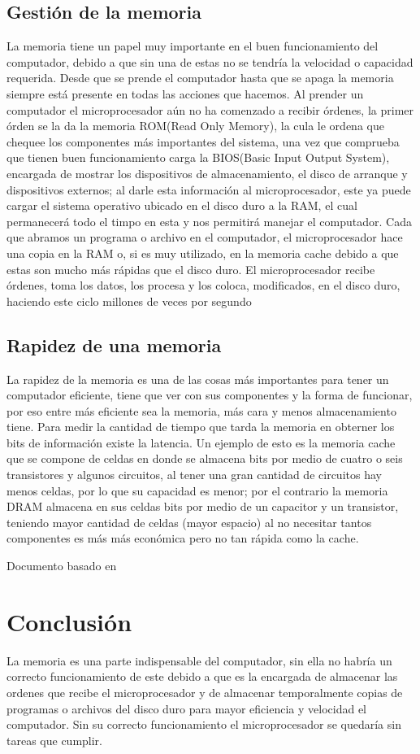 \documentclass{article}
\begin{document}
\subsection{Gestión de la memoria}
La memoria tiene un papel muy importante en el buen funcionamiento del computador, debido a que sin una de estas no se tendría la velocidad o capacidad requerida. Desde que se prende el computador hasta que se apaga la memoria siempre está presente en todas las acciones que hacemos. Al prender un computador el microprocesador aún no ha comenzado a recibir órdenes, la primer órden se la da la memoria ROM(Read Only Memory), la cula le ordena que chequee los componentes más importantes del sistema, una vez que comprueba que tienen buen funcionamiento carga la BIOS(Basic Input Output System), encargada de mostrar los dispositivos de almacenamiento, el disco de arranque y dispositivos externos; al darle esta información al microprocesador, este ya puede cargar el sistema operativo ubicado en el disco duro a la RAM, el cual permanecerá todo el timpo en esta y nos permitirá manejar el computador. Cada que abramos un programa o archivo en el computador, el microprocesador hace una copia en la RAM o, si es muy utilizado, en la memoria cache debido a que estas son mucho más rápidas que el disco duro. El microprocesador recibe órdenes, toma los datos, los procesa y los coloca, modificados, en el disco duro, haciendo este ciclo millones de veces por segundo

\subsection{Rapidez de una memoria}
La rapidez de la memoria es una de las cosas más importantes para tener un computador eficiente, tiene que ver con sus componentes y la forma de funcionar, por eso entre más eficiente sea la memoria, más cara y menos almacenamiento tiene. Para medir la cantidad de tiempo que tarda la memoria en obterner los bits de información existe la latencia. Un ejemplo de esto es la memoria cache que se compone de celdas en donde se almacena bits por medio de cuatro o seis transistores y algunos circuitos, al tener una gran cantidad de circuitos hay menos celdas, por lo que su capacidad es menor; por el contrario la memoria DRAM almacena en sus celdas bits por medio de un capacitor y un transistor, teniendo mayor cantidad de celdas (mayor espacio) al no necesitar tantos componentes es más más económica pero no tan rápida como la cache.

Documento basado en \cite{taller}

\section{Conclusión} \label{conclulsion}
La memoria es una parte indispensable del computador, sin ella no habría un correcto funcionamiento de este debido a que es la encargada de almacenar las ordenes que recibe el microprocesador y de almacenar temporalmente copias de programas o archivos del disco duro para mayor eficiencia y velocidad el computador. Sin su correcto funcionamiento el microprocesador se quedaría sin tareas que cumplir.



\end{document}
